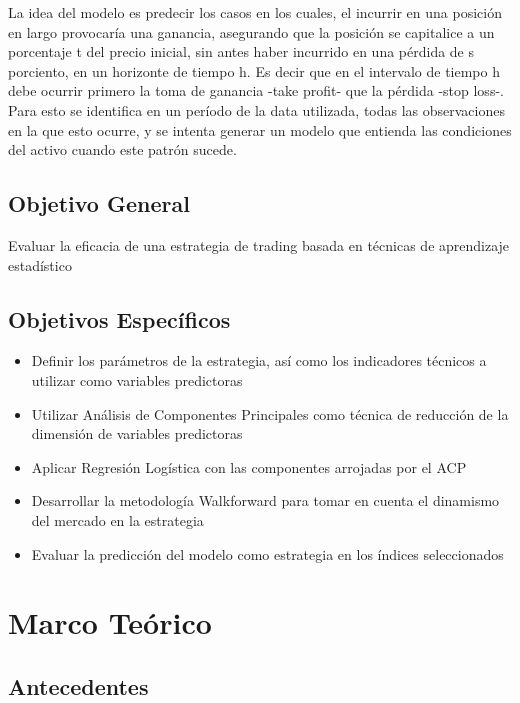 \documentclass[a4paper,12pt]{Latex/Classes/PhDthesisPSnPDF}
\begin{document}
La idea del modelo es predecir los casos en los cuales, el incurrir en una posición en largo provocaría una ganancia, asegurando que la posición se capitalice a un porcentaje t del precio inicial, sin antes haber incurrido en una pérdida de s porciento, en un horizonte de tiempo h. Es decir que en el intervalo de tiempo h debe ocurrir primero la toma de ganancia -take profit- que la pérdida -stop loss-. Para esto se identifica en un período de la data utilizada, todas las observaciones en la que esto ocurre, y se intenta generar un modelo que entienda las condiciones del activo cuando este patrón sucede.

\section{Objetivo General}

Evaluar la eficacia de una estrategia de trading basada en técnicas de aprendizaje estadístico

\section{Objetivos Específicos}

\begin{itemize}
\item Definir los parámetros de la estrategia, así como los indicadores técnicos a utilizar como variables predictoras
\item Utilizar Análisis de Componentes Principales como técnica de reducción de la dimensión de variables predictoras
\item Aplicar Regresión Logística con las componentes arrojadas por el ACP
\item Desarrollar la metodología Walkforward para tomar en cuenta el dinamismo del mercado en la estrategia
\item Evaluar la predicción del modelo como estrategia en los índices seleccionados
\end{itemize}


\chapter{Marco Teórico}

\section{Antecedentes}
\end{document}
